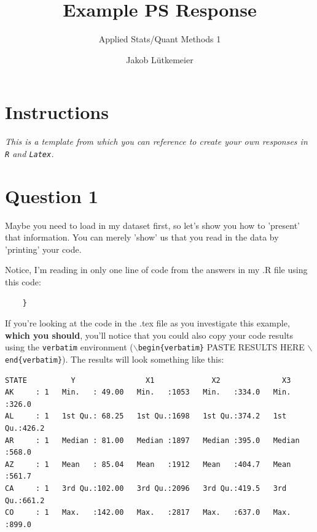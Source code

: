 \documentclass[12pt,letterpaper]{article}
\title{Example PS Response}
\date{Jakob Lütkemeier}
\author{Applied Stats/Quant Methods 1}
\begin{document}
	\maketitle
	
	\section*{Instructions}

 \textit{This is a template from which you can reference to create your own responses in \texttt{R} and \texttt{Latex}.}

\section*{Question 1 }

\noindent Maybe you need to load in my dataset first, so let's show you how to 'present' that information. You can merely 'show' us that you read in the data by 'printing' your code. \\

  

\vspace{.25cm}

\noindent Notice, I'm reading in only one line of code from the answers in my .R file using this code: 

\begin{verbatim}
	}
\end{verbatim}

\noindent If you're looking at the code in the .tex file as you investigate this example, \textbf{which you should}, you'll notice that you could also copy your code results using the \texttt{verbatim} environment (\texttt{$\backslash$begin\{verbatim\}} PASTE RESULTS HERE \texttt{$\backslash$end\{verbatim\}}). The results will look something like this:


\begin{verbatim}
STATE          Y                X1             X2              X3       
AK     : 1   Min.   : 49.00   Min.   :1053   Min.   :334.0   Min.   :326.0  
AL     : 1   1st Qu.: 68.25   1st Qu.:1698   1st Qu.:374.2   1st Qu.:426.2  
AR     : 1   Median : 81.00   Median :1897   Median :395.0   Median :568.0  
AZ     : 1   Mean   : 85.04   Mean   :1912   Mean   :404.7   Mean   :561.7  
CA     : 1   3rd Qu.:102.00   3rd Qu.:2096   3rd Qu.:419.5   3rd Qu.:661.2  
CO     : 1   Max.   :142.00   Max.   :2817   Max.   :637.0   Max.   :899.0  
\end{verbatim}
\vspace{.5cm}
\end{document}
